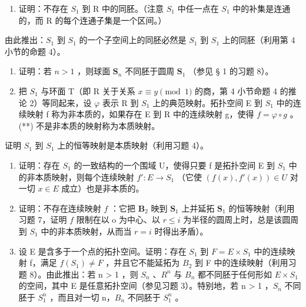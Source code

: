 \begin{enumerate}
\def\labelenumi{\arabic{enumi})}
\setcounter{enumi}{3}
\tightlist
\item
  证明：不存在 \(S_{1}\) 到 R 中的同胚。（注意 \(S_{1}\) 中任一点在 \(S_{1}\) 中的补集是连通的，而 R 的每个连通子集是一个区间。）
\end{enumerate}

由此推出：\(S_{1}\) 到 \(S_{1}\) 的一个子空间上的同胚必然是 \(S_{1}\) 到 \(S_{1}\) 上的同胚（利用第 4 小节的命题 4）。

\begin{enumerate}
\def\labelenumi{\arabic{enumi})}
\setcounter{enumi}{4}
\item
  证明：若 \(n > 1\) ，则球面 \(\mathbf{S}_n\) 不同胚于圆周 \(\mathbf{S}_1\) （参见 § 1 的习题 8）。
\item
  把 \(S_{1}\) 与环面 T（即 R 关于关系 \(x \equiv y \pmod{1}\) 的商，第 4 小节命题 4 的推论 2）等同起来，设 \(\varphi\) 表示 R 到 \(S_{1}\) 上的典范映射。拓扑空间 E 到 \(S_{1}\) 中的连续映射 f 称为非本质的，如果存在 E 到 R 中的连续映射 g，使得 \(f = \varphi \circ g\) 。(**) 不是非本质的映射称为本质映射。
\end{enumerate}

证明 \(S_{1}\) 到 \(S_{1}\) 上的恒等映射是本质映射（利用习题 4）。

\begin{enumerate}
\def\labelenumi{\arabic{enumi})}
\setcounter{enumi}{6}
\item
  证明：存在 \(S_{1}\) 的一致结构的一个围域 U，使得只要 f 是拓扑空间 E 到 \(S_{1}\) 中的非本质映射，则每个连续映射 \(f' : E \to S_{1}\) （它使 \((f(x), f'(x)) \in U\) 对一切 \(x \in E\) 成立）也是非本质的。
\item
  证明：不存在连续映射 \(f\) ：它把 \(\mathbf{B}_2\) 映到 \(\mathbf{S}_1\) 上并延拓 \(\mathbf{S}_1\) 的恒等映射（利用习题 7，证明 \(f\) 限制在以 o 为中心、以 \(r \leqslant i\) 为半径的圆周上时，总是该圆周到 \(S_{1}\) 中的非本质映射，从而当 \(r = i\) 时得出矛盾）。
\item
  设 E 是含多于一个点的拓扑空间。证明：存在 \(S_{1}\) 到 \(F = E \times S_{1}\) 中的连续映射 f，满足 \(f(S_{1}) \neq F\) ，并且它不能延拓为 \(B_{2}\) 到 F 中的连续映射（利用习题 8）。由此推出：若 n \textgreater{} 1 ，则 \(S_{n}\) 、\(R^{n}\) 与 \(B_{n}\) 都不同胚于任何形如 \(E \times S_{1}\) 的空间，其中 E 是任意拓扑空间（参见习题 3）。特别地，若 n \textgreater{} 1 ，\(S_{n}\) 不同胚于 \(S_{1}^{n}\) ，而且对一切 n，\(B_{n}\) 不同胚于 \(S_{1}^{n}\) 。
\end{enumerate}

